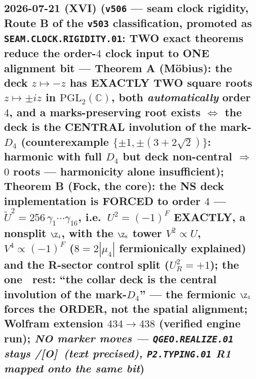 \documentclass[11pt]{article}
\providecommand{\mO}{\textbf{[O]}}\providecommand{\mX}{\textbf{[X]}}
\begin{document}
\subsection*{2026-07-21 (XVI) (\texttt{v506} --- seam clock rigidity, Route B of the \texttt{v503} classification, promoted as \texttt{SEAM.CLOCK.RIGIDITY.01}: TWO exact theorems reduce the order-$4$ clock input to ONE alignment bit --- Theorem A (M\"obius): the deck $z\mapsto-z$ has EXACTLY TWO square roots $z\mapsto\pm iz$ in $\mathrm{PGL}_2(\mathbb C)$, both \emph{automatically} order $4$, and a marks-preserving root exists $\iff$ the deck is the CENTRAL involution of the mark-$D_4$ (counterexample $\{\pm1,\pm(3{+}2\sqrt2)\}$: harmonic with full $D_4$ but deck non-central $\Rightarrow$ $0$ roots --- harmonicity alone insufficient); Theorem B (Fock, the core): the NS deck implementation is FORCED to order $4$ --- $\tilde U^2=256\,\gamma_1\cdots\gamma_{16}$, i.e.\ $U^2=(-1)^F$ EXACTLY, a nonsplit $\Z_4$, with the $\Z_8$ tower $V^2\propto U$, $V^4\propto(-1)^F$ ($8=2|\mu_4|$ fermionically explained) and the R-sector control split ($U_R^2=+1$); the one \mC\ rest: ``the collar deck is the central involution of the mark-$D_4$'' --- the fermionic $\Z_4$ forces the ORDER, not the spatial alignment; Wolfram extension $434\to438$ (verified engine run); \emph{NO marker moves --- \texttt{QGEO.REALIZE.01} stays \mC/\mO\ (text precised), \texttt{P2.TYPING.01} R1 mapped onto the same bit})}
\end{document}
